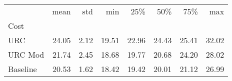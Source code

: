 \begin{tabular}{lrrrrrrr}
\toprule
 & mean & std & min & 25\% & 50\% & 75\% & max \\
Cost &  &  &  &  &  &  &  \\
\midrule
URC & 24.05 & 2.12 & 19.51 & 22.96 & 24.43 & 25.41 & 32.02 \\
URC Mod & 21.74 & 2.45 & 18.68 & 19.77 & 20.68 & 24.20 & 28.02 \\
Baseline & 20.53 & 1.62 & 18.42 & 19.42 & 20.01 & 21.12 & 26.99 \\
\bottomrule
\end{tabular}
